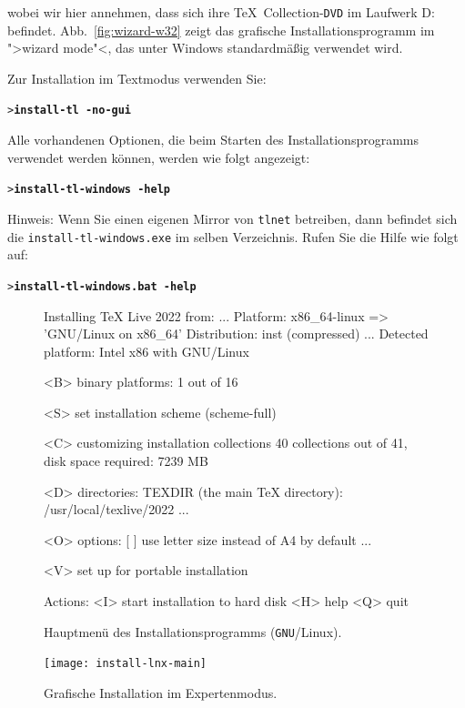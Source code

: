 \documentclass[12pt,ngerman,a4paper,fullparskip]{report}
\newcommand{\acro}[1]{\texttt{#1}}
\newcommand{\dirname}[1]{\texttt{#1}}
\newcommand{\Ucom}[1]{\textbf{\texttt{#1}}}
\def\TK{\TeX\ Collection}
\providecommand*{\DVD}{\acro{DVD}\xspace}
\providecommand*{\GNU}{\acro{GNU}\xspace}
\begin{document}
wobei wir hier annehmen, dass sich ihre \TK-\DVD im Laufwerk D: befindet.
Abb.~\ref{fig:wizard-w32} zeigt das grafische Installationsprogramm im
">wizard mode"<, das unter Windows standardmäßig verwendet wird.

Zur Installation im Textmodus verwenden Sie:
\begin{alltt}
> \Ucom{install-tl -no-gui}
\end{alltt}

\noindent Alle vorhandenen Optionen, die beim Starten des Installationsprogramms verwendet werden können, werden
wie folgt angezeigt:

\begin{alltt}
> \Ucom{install-tl-windows -help}
\end{alltt}

Hinweis: Wenn Sie einen eigenen Mirror von \dirname{tlnet} betreiben, dann befindet sich die \texttt{install-tl-windows.exe} im selben Verzeichnis. Rufen Sie die Hilfe wie folgt auf:

\begin{alltt}
> \Ucom{install-tl-windows.bat -help}
\end{alltt}


\begin{figure}[tb]
\begin{boxedverbatim}
Installing TeX Live 2022 from: ...
Platform: x86_64-linux => 'GNU/Linux on x86_64'
Distribution: inst (compressed)
...
 Detected platform: Intel x86 with GNU/Linux
 
 <B> binary platforms: 1 out of 16

 <S> set installation scheme (scheme-full)

 <C> customizing installation collections
     40 collections out of 41, disk space required: 7239 MB

 <D> directories:
   TEXDIR (the main TeX directory):
     /usr/local/texlive/2022
   ...

 <O> options:
   [ ] use letter size instead of A4 by default
   ...
 
 <V> set up for portable installation

Actions:
 <I> start installation to hard disk
 <H> help
 <Q> quit
\end{boxedverbatim}
\caption{Hauptmenü des Installationsprogramms (\GNU/Linux).}\label{fig:text-main}
\end{figure}

\begin{figure}[tb]
\texttt{[image: install-lnx-main]}
\caption{Grafische Installation im Expertenmodus.}\label{fig:gui-main}
\end{figure}
\end{document}
